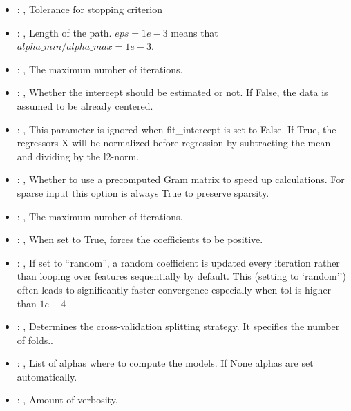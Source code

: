 \begin{itemize}
    \item {}: , 
      Tolerance for stopping criterion

    \item {}: , 
      Length of the path. $eps=1e-3$ means that
      $alpha\_min / alpha\_max = 1e-3$.

    \item {}: , 
      The maximum number of iterations.

    \item {}: , 
      Whether the intercept should be estimated or not. If False,
      the data is assumed to be already centered.

    \item {}: , 
      This parameter is ignored when fit\_intercept is set to False. If True,
      the regressors X will be normalized before regression by subtracting the mean and
      dividing by the l2-norm.

    \item {}: , 
      Whether to use a precomputed Gram matrix to speed up calculations.
      For sparse input this option is always True to preserve sparsity.

    \item {}: , 
      The maximum number of iterations.

    \item {}: , 
      When set to True, forces the coefficients to be positive.

    \item {}: , 
      If set to ``random'', a random coefficient is updated every iteration
      rather than looping over features sequentially by default. This (setting to `random'')
      often leads to significantly faster convergence especially when tol is higher than $1e-4$

    \item {}: , 
      Determines the cross-validation splitting strategy.
      It specifies the number of folds..

    \item {}: , 
      List of alphas where to compute the models. If None alphas
      are set automatically.

    \item {}: , 
      Amount of verbosity.
  \end{itemize}


